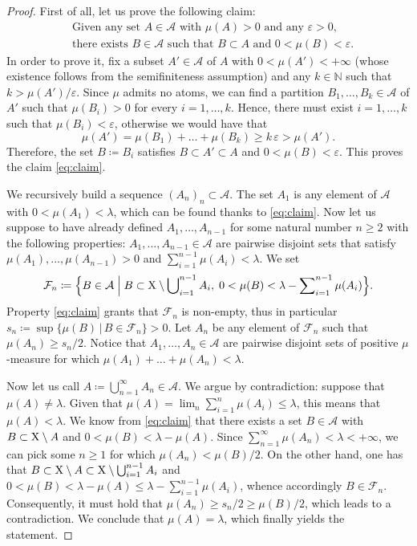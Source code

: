 \documentclass[reqno]{amsart}
\numberwithin{equation}{section}
\newcommand{\N}{\mathbb{N}}
\newcommand{\X}{{\rm X}}
\newcommand{\1}{\mathbbm 1}
\begin{document}
\begin{proof}
First of all, let us prove the following claim:
\begin{equation}\label{eq:claim}\begin{split}
&\text{Given any set }A\in\mathcal A\text{ with }\mu(A)>0\text{ and any }\varepsilon>0,\\
&\text{there exists }B\in\mathcal A\text{ such that }B\subset A\text{ and }
0<\mu(B)<\varepsilon.
\end{split}\end{equation}
In order to prove it, fix a subset \(A'\in\mathcal A\) of \(A\) with \(0<\mu(A')<+\infty\)
(whose existence follows from the semifiniteness assumption) and any \(k\in\N\) such that
\(k>\mu(A')/\varepsilon\). Since \(\mu\) admits no atoms, we can find a partition
\(B_1,\ldots,B_k\in\mathcal A\) of \(A'\) such that \(\mu(B_i)>0\) for every
\(i=1,\ldots,k\). Hence, there must exist \(i=1,\ldots,k\) such that
\(\mu(B_i)<\varepsilon\), otherwise we would have that
\[
\mu(A')=\mu(B_1)+\ldots+\mu(B_k)\geq k\,\varepsilon>\mu(A').
\]
Therefore, the set \(B\coloneqq B_i\) satisfies \(B\subset A'\subset A\)
and \(0<\mu(B)<\varepsilon\). This proves the claim \eqref{eq:claim}.

We recursively build a sequence \((A_n)_n\subset\mathcal A\).
The set \(A_1\) is any element of \(\mathcal A\) with \(0<\mu(A_1)<\lambda\),
which can be found thanks to \eqref{eq:claim}. Now let us suppose to have already
defined \(A_1,\ldots,A_{n-1}\) for some natural number \(n\geq 2\) with the following
properties: \(A_1,\ldots,A_{n-1}\in\mathcal A\) are pairwise disjoint sets that satisfy
\(\mu(A_1),\ldots,\mu(A_{n-1})>0\) and \(\sum_{i=1}^{n-1}\mu(A_i)<\lambda\). We set
\[
\mathcal F_n\coloneqq\Big\{B\in\mathcal A\;\Big|\;B\subset\X\setminus\bigcup
\nolimits_{i=1}^{n-1}A_i,\;0<\mu(B)<\lambda-\sum\nolimits_{i=1}^{n-1}\mu(A_i)\Big\}.
\]
Property \eqref{eq:claim} grants that \(\mathcal F_n\) is non-empty,
thus in particular \(s_n\coloneqq\sup\big\{\mu(B)\,\big|\,B\in\mathcal F_n\big\}>0\).
Let \(A_n\) be any element of \(\mathcal F_n\) such that \(\mu(A_n)\geq s_n/2\).
Notice that \(A_1,\ldots,A_n\in\mathcal A\) are pairwise disjoint sets of positive
\(\mu\)-measure for which \(\mu(A_1)+\ldots+\mu(A_n)<\lambda\).

Now let us call \(A\coloneqq\bigcup_{n=1}^\infty A_n\in\mathcal A\).
We argue by contradiction: suppose that \(\mu(A)\neq\lambda\).
Given that \(\mu(A)=\lim_n\sum_{i=1}^n\mu(A_i)\leq\lambda\),
this means that \(\mu(A)<\lambda\). We know from \eqref{eq:claim} that
there exists a set \(B\in\mathcal A\) with \(B\subset\X\setminus A\)
and \(0<\mu(B)<\lambda-\mu(A)\). Since \(\sum_{n=1}^\infty\mu(A_n)<\lambda<+\infty\),
we can pick some \(n\geq 1\) for which \(\mu(A_n)<\mu(B)/2\). On the other hand,
one has that \(B\subset\X\setminus A\subset\X\setminus\bigcup_{i=1}^{n-1}A_i\) and
\(0<\mu(B)<\lambda-\mu(A)\leq\lambda-\sum_{i=1}^{n-1}\mu(A_i)\), whence accordingly
\(B\in\mathcal F_n\). Consequently, it must hold that \(\mu(A_n)\geq s_n/2\geq\mu(B)/2\),
which leads to a contradiction. We conclude that \(\mu(A)=\lambda\), which finally
yields the statement.
\end{proof}
\end{document}

